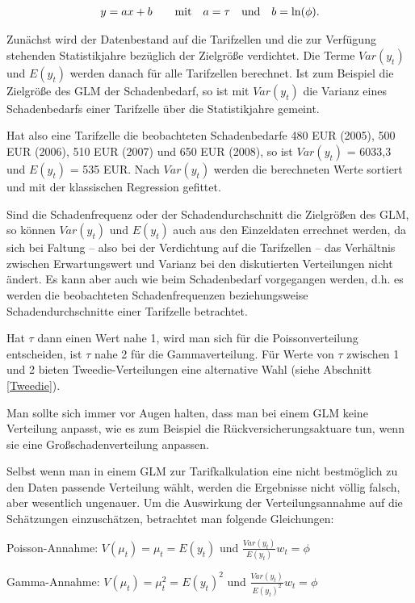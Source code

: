 \begin{eqnarray}
y=ax+b    \qquad \textnormal{mit} \quad  a=\tau \quad \textnormal{und} \quad b=\ln(\phi).
\end{eqnarray}
 
Zunächst wird der Datenbestand auf die Tarifzellen und die zur Verfügung stehenden Statistikjahre bezüglich der Zielgröße verdichtet. Die Terme  $Var(y_t)$  und  $E(y_t)$ werden danach für alle Tarifzellen berechnet. Ist zum Beispiel die Zielgröße des GLM der Schadenbedarf, so ist mit $Var(y_t)$  die Varianz eines Schadenbedarfs einer Tarifzelle über die Statistikjahre gemeint.

Hat also eine Tarifzelle die beobachteten Schadenbedarfe 480 EUR (2005), 500 EUR (2006), 510 EUR (2007) und 650 EUR (2008), so ist  $Var(y_t)$ = 6033,3 und  $E(y_t)$ = 535 EUR. Nach $Var(y_t)$ werden die berechneten Werte sortiert und mit der klassischen Regression gefittet.

Sind die Schadenfrequenz oder der Schadendurchschnitt die Zielgrößen des GLM, so können $Var(y_t)$  und  $E(y_t)$  auch aus den Einzeldaten errechnet werden, da sich bei Faltung – also bei der Verdichtung auf die Tarifzellen – das Verhältnis zwischen Erwartungswert und Varianz bei den diskutierten Verteilungen nicht ändert. Es kann aber auch wie beim Schadenbedarf vorgegangen werden, d.h. es werden die beobachteten Schadenfrequenzen beziehungsweise Schadendurchschnitte einer Tarifzelle betrachtet.

Hat $\tau$ dann einen Wert nahe 1, wird man sich für die Poissonverteilung entscheiden, ist  $\tau$ nahe 2 für die Gammaverteilung. Für Werte von $\tau$  zwischen 1 und 2 bieten Tweedie-Verteilungen eine alternative Wahl (siehe Abschnitt \ref{Tweedie}).

Man sollte sich immer vor Augen halten, dass man bei einem GLM keine Verteilung anpasst, wie es zum Beispiel die Rückversicherungsaktuare tun, wenn sie eine Großschadenverteilung anpassen. 

Selbst wenn man in einem GLM zur Tarifkalkulation eine nicht bestmöglich zu den Daten passende Verteilung wählt, werden die Ergebnisse nicht völlig falsch, aber wesentlich ungenauer. Um die Auswirkung der Verteilungsannahme auf die Schätzungen einzuschätzen, betrachtet man folgende Gleichungen:

Poisson-Annahme:  $V(\mu_t) = \mu_t = E(y_t)$  und  $\frac{Var(y_t)}{ E(y_t)}w_t=\phi$
 
Gamma-Annahme:  $V(\mu_t) = \mu_t^2 = E(y_t)^2$  und  $\frac{Var(y_t)}{ E(y_t)^2}w_t=\phi$
 
